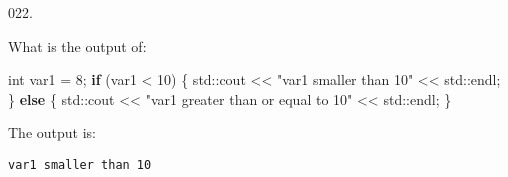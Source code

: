 \documentclass[]{book}
\newenvironment{Shaded}{}{}
\newcommand{\BuiltInTok}[1]{#1}
\newcommand{\ControlFlowTok}[1]{\textcolor[rgb]{0.00,0.44,0.13}{\textbf{#1}}}
\newcommand{\DataTypeTok}[1]{\textcolor[rgb]{0.56,0.13,0.00}{#1}}
\newcommand{\DecValTok}[1]{\textcolor[rgb]{0.25,0.63,0.44}{#1}}
\newcommand{\NormalTok}[1]{#1}
\newcommand{\StringTok}[1]{\textcolor[rgb]{0.25,0.44,0.63}{#1}}
\begin{document}
\vspace{2mm}\noindent\hrulefill{}

\begin{minipage}{\linewidth}\noindent
{\tiny 022.}\\
\begin{minipage}[t]{.485\linewidth}

What is the output of:

\begin{framed}

\begin{Shaded}
\begin{Highlighting}[]
\DataTypeTok{int}\NormalTok{ var1 = }\DecValTok{8}\NormalTok{;}
\ControlFlowTok{if}\NormalTok{ (var1 < }\DecValTok{10}\NormalTok{) \{}
  \BuiltInTok{std::}\NormalTok{cout << }\StringTok{"var1 smaller than 10"}
\NormalTok{            << }\BuiltInTok{std::}\NormalTok{endl;}
\NormalTok{\} }\ControlFlowTok{else}\NormalTok{ \{}
  \BuiltInTok{std::}\NormalTok{cout}
\NormalTok{    << }\StringTok{"var1 greater than or equal to 10"}
\NormalTok{    << }\BuiltInTok{std::}\NormalTok{endl;}
\NormalTok{\}}
\end{Highlighting}
\end{Shaded}

\end{framed}

\end{minipage}
\hfill
\begin{minipage}[t]{.485\linewidth}

The output is:

\begin{framed}

\begin{verbatim}
var1 smaller than 10
\end{verbatim}

\end{framed}

\end{minipage}
\end{minipage}

\vspace{2mm}\noindent\hrulefill{}
\end{document}
